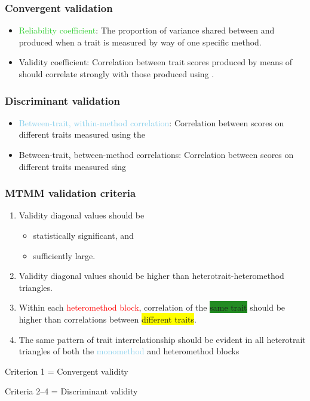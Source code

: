 \documentclass[compress,dvipsnames]{beamer}\usepackage[]{graphicx}\usepackage[]{xcolor}
\begin{document}
\begin{frame}[fragile]
	\frametitle{Convergent validation}
		\begin{itemize}
			\item \textcolor{LimeGreen}{Reliability coefficient}: The proportion of variance shared between  and  produced when a trait is measured by way of one specific method.
			\item \textcolor{CarnationPink}{Validity coefficient}: Correlation between trait scores produced by means of  should correlate strongly with those produced using .
		\end{itemize}
\end{frame}


\begin{frame}[fragile]
	\frametitle{Discriminant validation}
		\begin{itemize}
			\item \textcolor{SkyBlue}{Between-trait, within-method correlation}: Correlation between scores on different traits measured using the 
			\item \textcolor{Dandelion}{Between-trait, between-method correlations}: Correlation between scores on different traits measured sing 
		\end{itemize}
\end{frame}


\begin{frame}[fragile]
	\frametitle{MTMM validation criteria}
		\begin{enumerate}
			\item \textcolor{CarnationPink}{Validity diagonal} values should be
				\begin{itemize}
					\item statistically significant, and
					\item sufficiently large.
				\end{itemize}
			\item \textcolor{CarnationPink}{Validity diagonal} values should be higher than \textcolor{Dandelion}{heterotrait-heteromethod triangles}.
			\item Within each \textcolor{red}{heteromethod block}, correlation of the \colorbox{ForestGreen}{same trait} should be higher than correlations between \colorbox{Yellow}{different traits}.
			\item The same pattern of trait interrelationship should be evident in all heterotrait triangles of both the \textcolor{SkyBlue}{monomethod} and \textcolor{Dandelion}{heteromethod} blocks
		\end{enumerate}

		Criterion 1 = Convergent validity

		Criteria 2--4 = Discriminant validity
\end{frame}
\end{document}
